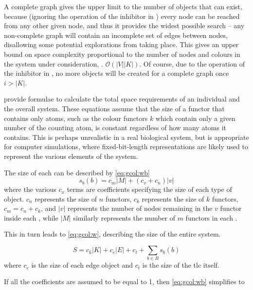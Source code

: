 A complete graph gives the upper limit to the number of objects that can exist, because (ignoring the operation of the inhibitor in ) every node can be reached from any other given node, and thus it provides the widest possible search -- any non-complete graph will contain an incomplete set of edges between nodes, disallowing some potential explorations from taking place.  This gives an upper bound on space complexity proportional to the number of nodes and colours in the system under consideration, \ie{}. \(\mathcal{O}(|V||K|)\).  Of course, due to the operation of the inhibitor in , no more \bo{} objects will be created for a complete graph once \(i > |K|\).

 provide formulae to calculate the total space requirements of an individual \bo{} and the overall system. These equations assume that the size of a functor that contains only atoms, such as the colour functors \(k\) which contain only a given number of the counting atom, is constant regardless of how many atoms it contains.  This is perhaps unrealistic in a real biological system, but is appropriate for computer simulations, where fixed-bit-length representations are likely used to represent the various elements of the system.

The size of each \bo{} can be described by \cref{eq:gcol:wb}
\begin{equation}\label{eq:gcol:wb}
    s_b(b) = c_m |M| + (c_v + c_n) |v|
\end{equation} where the various \(c_x\) terms are coefficients specifying the size of each type of object.  \(c_n\) represents the size of \(n\) functors, \(c_k\) represents the size of \(k\) functors, \(c_m = c_n + c_k\), and \(|v|\) represents the number of nodes remaining in the \(v\) functor inside each \bo{}, while \(|M|\) similarly represents the number of \(m\) functors in each \bo{}.

This in turn leads to \cref{eq:gcol:w}, describing the size of the entire system.

\begin{equation}\label{eq:gcol:w}
    S = c_k |K| + c_e |E| + c_t + \sum_{b \in B}s_b(b)
\end{equation} where \(c_e\) is the size of each edge object and \(c_t\) is the size of the \gls{tlc} itself.

If all the coefficients are assumed to be equal to 1, then \cref{eq:gcol:wb} simplifies to 

